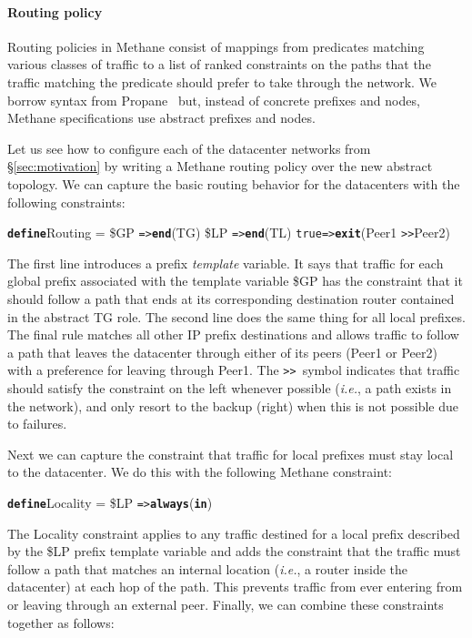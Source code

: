 \documentclass[numbers, 10pt, preprint]{sigplanconf}
\newcommand{\IE}{\emph{i.e.}}
\newcommand{\sysname}{{\small \sf Methane}\xspace}
\newcommand{\para}[1]{\paragraph*{\textbf{#1}}}
\newcommand{\CD}[1]{\texttt{\small #1}}  %
\newcommand{\KW}[1]{\texttt{\small\bfseries{#1}}}
\newcommand{\True}{\CD{true}}
\newcommand{\Define}{\KW{define}}
\newcommand{\Prefer}{\texttt{>>}}
\newcommand{\Path}{\texttt{=>}}
\newcommand{\In}{\KW{in}}
\newcommand{\Exit}{\KW{exit}}
\newcommand{\End}{\KW{end}}
\newcommand{\Always}{\KW{always}}
\begin{document}

\para{Routing policy} Routing policies in \sysname consist of mappings from predicates matching various classes of traffic to a list of ranked constraints on the paths that the traffic matching the predicate should prefer to take through the network. We borrow syntax from Propane~\cite{propane} but, instead of concrete prefixes and nodes, \sysname specifications use abstract prefixes and nodes.

Let us see how to configure each of the datacenter networks from \S\ref{sec:motivation} by writing a \sysname routing policy over the new abstract topology. We can capture the basic routing behavior for the datacenters with the following constraints:
%
\begin{code}
\Define Routing =
    \$GP  \Path \End(TG)
    \$LP  \Path \End(TL)
    \True \Path \Exit(Peer1 \Prefer Peer2)
\end{code}
\noindent%

The first line introduces a prefix \emph{template} variable. It says that traffic for each global prefix associated with the template variable \$GP has the constraint that it should follow a path that ends at its corresponding destination router contained in the abstract TG role. The second line does the same thing for all local prefixes.
%
The final rule matches all other IP prefix destinations and allows traffic to follow a path that leaves the datacenter through either of its peers (Peer1 or Peer2) with a preference for leaving through Peer1. The \Prefer~symbol indicates that traffic should satisfy the constraint on the left whenever possible (\IE, a path exists in the network), and only resort to the backup (right) when this is not possible due to failures.%

Next we can capture the constraint that traffic for local prefixes must stay local to the datacenter.
We do this with the following \sysname constraint:
%
\begin{code}
\Define Locality =
    \$LP \Path \Always(\In)
\end{code}
\noindent%
%
The Locality constraint applies to any traffic destined for a local prefix described by the \$LP prefix template variable and adds the constraint that the traffic must follow a path that matches an internal location (\IE, a router inside the datacenter) at each hop of the path. This prevents traffic from ever entering from or leaving through an external peer. Finally, we can combine these constraints together as follows:
\end{document}
